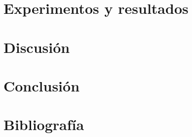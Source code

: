 \documentclass[a4paper]{article}
\begin{document}
\section{Experimentos y resultados}

\section{Discusi\'on}

\section{Conclusi\'on}

\section{Bibliograf\'ia}
\end{document}
